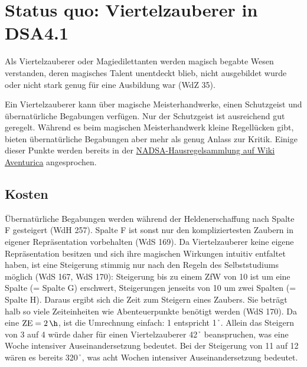 \section{Status quo: Viertelzauberer in DSA4.1}
Als Viertelzauberer oder Magiedilettanten werden magisch begabte Wesen verstanden, deren magisches Talent unentdeckt blieb, nicht ausgebildet wurde oder nicht stark genug für eine Ausbildung war (WdZ 35).

Ein Viertelzauberer kann über magische Meisterhandwerke, einen Schutzgeist und übernatürliche Begabungen verfügen. Nur der Schutzgeist ist ausreichend gut geregelt. Während es beim magischen Meisterhandwerk kleine Regellücken gibt, bieten übernatürliche Begabungen aber mehr als genug Anlass zur Kritik. Einige dieser Punkte werden bereits in der \href{http://www.wiki-aventurica.de/wiki/Hausregelsammlung/NADSA/Viertelzauberer}{NADSA-Hausregelsammlung auf Wiki Aventurica} angesprochen.

\subsection{Kosten}
Übernatürliche Begabungen werden während der Heldenerschaffung nach Spalte F gesteigert (WdH 257). Spalte F ist sonst nur den kompliziertesten Zaubern in eigener Repräsentation vorbehalten (WdS 169). Da Viertelzauberer keine eigene Repräsentation besitzen und sich ihre magischen Wirkungen intuitiv entfaltet haben, ist eine Steigerung stimmig nur nach den Regeln des Selbststudiums möglich (WdS 167, WdS 170): Steigerung bis zu einem ZfW von 10 ist um eine Spalte (= Spalte G) erschwert, Steigerungen jenseits von 10 um zwei Spalten (= Spalte H). Daraus ergibt sich die Zeit zum Steigern eines Zaubers. Sie beträgt halb so viele Zeiteinheiten wie Abenteuerpunkte benötigt werden (WdS 170). Da eine $\si{ZE} = \SI{2}{\h}$, ist die Umrechnung einfach: \SI{1}{\AP} entspricht \SI{1}{\h}. Allein das Steigern von 3 auf 4 würde daher für einen Viertelzauberer \SI{42}{\h} beanspruchen, was eine Woche intensiver Auseinandersetzung bedeutet. Bei der Steigerung von 11 auf 12 wären es bereits \SI{320}{\h}, was acht Wochen intensiver Auseinandersetzung bedeutet.

